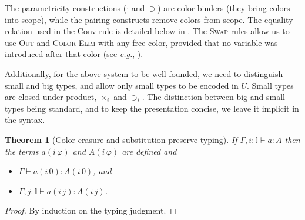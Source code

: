 \documentclass[english]{PaperTools/latex/entcs}
\theoremstyle{plain}
\newtheorem{theorem}{Theorem}
\theoremstyle{definition}
\newtheorem{definition}[theorem]{Definition}
\theoremstyle{remark}
\newcommand\CP[3]{(#2,_{#1} #3)}
\newcommand\CTimes[2]{(#2) ×_{#1}}
\newcommand\param[1]{\!\cdot\!#1}
\newcommand\op[1]{∋_{#1}}
\newcommand\fp[3]{⟨#2 ,_{#1} #3⟩}
\newcommand\comment[1]{}
\def\eg{\textit{e.g.}}
\begin{document}
The parametricity constructions ($·$ and $∋$) are color
binders (they bring colors into scope), while the pairing constructs
remove colors from scope.
The equality relation used in the {\sc Conv} rule is detailed below in
.  The \textsc{Swap} rules allow us to use
\textsc{Out} and \textsc{Color-Elim} with any free color, provided that
no variable was introduced after that color (see \eg, ).

Additionally, for the above system to be well-founded, we need to
distinguish small and big types, and allow only small types to be
encoded in $U$. Small types are closed under product, $×_i$ and
$∋_i$. The distinction between big and small types being standard, and
to keep the presentation concise, we leave it implicit in the syntax.

\begin{theorem}[Color erasure and substitution preserve typing]
  If $Γ,i:𝕀  ⊢ a : A$ then the terms $a(i\,φ)$ and $A(i\,φ)$ are
  defined and
  \begin{itemize}
    \item $Γ ⊢ a(i\,0) : A(i\,0)$, and
    \item $Γ, j :𝕀 ⊢ a(i\,j) : A(i\,j)$.
  \end{itemize}
\end{theorem}
\begin{proof}
  By induction on the typing judgment.
\end{proof}

\comment{
\begin{definition}[Normal forms and neutral terms]~
  \begin{align*}
    \mathsf{Nf} ∋ u,v,A,B & \coloneqq
      U \mid λx:A. t \mid (x:A) → B \\
      & \mid \CP i u v \mid \fp i u v \\
      & \mid {(\CTimes {i₀} A B)} \op {i₁} {u_1 \cdots} \op {i_n} {u_n} &\quad \text{($i₀ \prec i₁ \prec \ldots \prec i_n$)} \\
      & \mid s \param {i₀} \cdots \param {i_{n-1}}                  &\quad \text{($i₀ \prec   < \ldots \prec i_{n-1}$)}
    \\
    \mathsf{Ne} ∋ s & \coloneqq x \mid s \, u
  \end{align*}
\end{definition}
}
\end{document}
